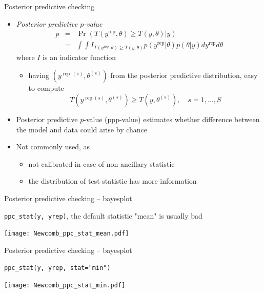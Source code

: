 \documentclass[t]{beamer}
\DeclareMathOperator{\rep}{\mathrm{rep}}
\begin{document}
\begin{frame}{Posterior predictive checking}

  \begin{itemize}
  \item<1-> \textit{Posterior predictive $p$-value}
    \begin{eqnarray*}
      p & = & \Pr(T(y^{\rep},\theta)\geq T(y,\theta)|y)\\
      & = & \int\int
      I_{T(y^{\rep},\theta)\geq T(y,\theta)}p(y^{\rep}|\theta)p(\theta|y)dy^{\rep}d\theta
    \end{eqnarray*}
    where $I$ is an indicator function
    \begin{itemize}
    \item<1->  having $(y^{\rep\,(s)},\theta^{(s)})$ from the posterior predictive
      distribution, easy to compute
      \begin{equation*}
        T(y^{\rep (s)},\theta^{(s)})\geq T(y,\theta^{(s)}), \quad s=1,\ldots,S
      \end{equation*}
    \end{itemize}
    \vspace{-1.5\baselineskip}
  \item<1-> Posterior predictive $p$-value (ppp-value) estimates whether
    difference between the model and data could arise by chance
  \item<1-> \color{black} Not commonly used, as
    \begin{itemize}
    \item not calibrated in case of non-ancillary statistic
    \item the distribution of test statistic has more information
    \end{itemize}
  \end{itemize}

\end{frame}

\begin{frame}{Posterior predictive checking -- bayesplot}

  \vspace{-1\baselineskip}
  \texttt{ppc\_stat(y, yrep)}, the default statistic "mean" is usually bad
  
  \texttt{[image: Newcomb\_ppc\_stat\_mean.pdf]}

\end{frame}

\begin{frame}{Posterior predictive checking -- bayesplot}

  \vspace{-1\baselineskip}
  \texttt{ppc\_stat(y, yrep, stat="min")}
  
  \texttt{[image: Newcomb\_ppc\_stat\_min.pdf]}

\end{frame}
\end{document}
